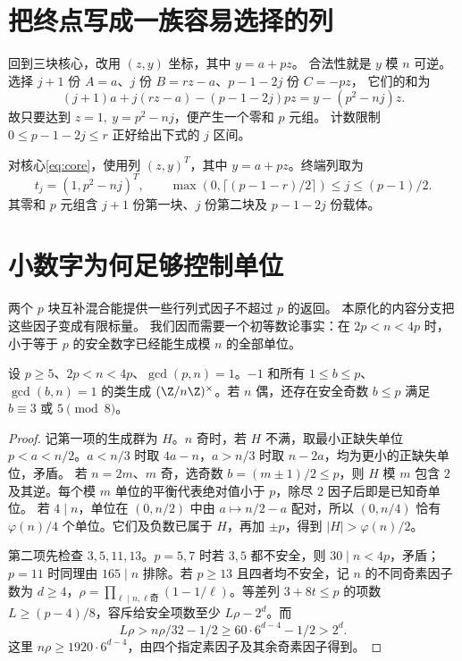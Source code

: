 \section{把终点写成一族容易选择的列}
回到三块核心，改用 $(z,y)$ 坐标，其中 $y=a+pz$。
合法性就是 $y$ 模 $n$ 可逆。
选择 $j+1$ 份 $A=a$、$j$ 份 $B=rz-a$、$p-1-2j$ 份 $C=-pz$，
它们的和为
\[
(j+1)a+j(rz-a)-(p-1-2j)pz
=y-(p^2-nj)z.
\]
故只要达到 $z=1,\ y=p^2-nj$，便产生一个零和 $p$ 元组。
计数限制 $0\le p-1-2j\le r$ 正好给出下式的 $j$ 区间。

对核心\eqref{eq:core}，使用列 $(z,y)^T$，其中 $y=a+pz$。终端列取为
\begin{equation}\label{eq:terminal}
t_j=(1,p^2-nj)^T,\qquad
\max(0,\lceil(p-1-r)/2\rceil)\le j\le(p-1)/2.
\end{equation}
其零和 $p$ 元组含 $j+1$ 份第一块、$j$ 份第二块及 $p-1-2j$ 份载体。


\section{小数字为何足够控制单位}
两个 $p$ 块互补混合能提供一些行列式因子不超过 $p$ 的返回。
本原化的内容分支把这些因子变成有限标量。
我们因而需要一个初等数论事实：在 $2p<n<4p$ 时，
小于等于 $p$ 的安全数字已经能生成模 $n$ 的全部单位。

\begin{lemma}[小数字生成模n单位群]\label{lem:small-units}
设 $p\ge5$、$2p<n<4p$、$\gcd(p,n)=1$。$-1$ 和所有 $1\le b\le p$、$\gcd(b,n)=1$ 的类生成 $(\Z/n\Z)^\times$。若 $n$ 偶，还存在安全奇数 $b\le p$ 满足 $b\equiv3$ 或 $5\pmod8$。
\end{lemma}
\begin{proof}
记第一项的生成群为 $H$。$n$ 奇时，若 $H$ 不满，取最小正缺失单位 $p<a<n/2$。$a<n/3$ 时取 $4a-n$，$a>n/3$ 时取 $n-2a$，均为更小的正缺失单位，矛盾。
若 $n=2m$、$m$ 奇，选奇数 $b=(m\pm1)/2\le p$，则 $H$ 模 $m$ 包含 $2$ 及其逆。每个模 $m$ 单位的平衡代表绝对值小于 $p$，除尽 $2$ 因子后即是已知奇单位。
若 $4\mid n$，单位在 $(0,n/2)$ 中由 $a\mapsto n/2-a$ 配对，所以 $(0,n/4)$ 恰有 $\varphi(n)/4$ 个单位。它们及负数已属于 $H$，再加 $\pm p$，得到 $|H|>\varphi(n)/2$。

第二项先检查 $3,5,11,13$。$p=5,7$ 时若 $3,5$ 都不安全，则 $30\mid n<4p$，矛盾；$p=11$ 时同理由 $165\mid n$ 排除。若 $p\ge13$ 且四者均不安全，记 $n$ 的不同奇素因子数为 $d\ge4$，$\rho=\prod_{\ell\mid n,\ell\text{奇}}(1-1/\ell)$。等差列 $3+8t\le p$ 的项数 $L\ge(p-4)/8$，容斥给安全项数至少 $L\rho-2^d$。而
\[
L\rho>n\rho/32-1/2\ge60\cdot6^{d-4}-1/2>2^d.
\]
这里 $n\rho\ge1920\cdot6^{d-4}$，由四个指定素因子及其余奇素因子得到。
\end{proof}


